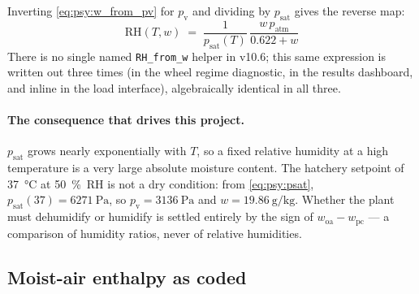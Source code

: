 \documentclass[11pt]{article}
\providecommand{\celsius}{\degreeCelsius}
\newcommand{\patm}{\ensuremath{p_{\mathrm{atm}}}}
\newcommand{\psat}{\ensuremath{p_{\mathrm{sat}}}}
\newcommand{\RH}{\ensuremath{\mathrm{RH}}}
\begin{document}
Inverting \eqref{eq:psy:w_from_pv} for $p_{\mathrm{v}}$ and dividing by $\psat$ gives the reverse
map:
\begin{equation}
\boxed{\;\RH(T,w) \;=\; \frac{1}{\psat(T)}\,\frac{w\,\patm}{0.622 + w}\;} \label{eq:psy:RH_from_w}
\end{equation}
There is no single named \texttt{RH\_from\_w} helper in v10.6; this same expression is written out
three times (in the wheel regime diagnostic, in the results dashboard, and inline in the load
interface), algebraically identical in all three.

\paragraph{The consequence that drives this project.}
$\psat$ grows nearly exponentially with $T$, so a fixed relative humidity at a high temperature is a
very large absolute moisture content. The hatchery setpoint of \SI{37}{\celsius} at
\SI{50}{\percent}~RH is not a dry condition: from \eqref{eq:psy:psat}, $\psat(37) =
\SI{6271}{\pascal}$, so $p_{\mathrm{v}} = \SI{3136}{\pascal}$ and $w =
\SI{19.86}{\gram\per\kilogram}$. Whether the plant must dehumidify or humidify is settled entirely
by the sign of $w_{\mathrm{oa}} - w_{\mathrm{pc}}$ --- a comparison of humidity ratios, never of
relative humidities.

\subsection{Moist-air enthalpy as coded}
\label{sec:psy:enthalpy}
\end{document}
